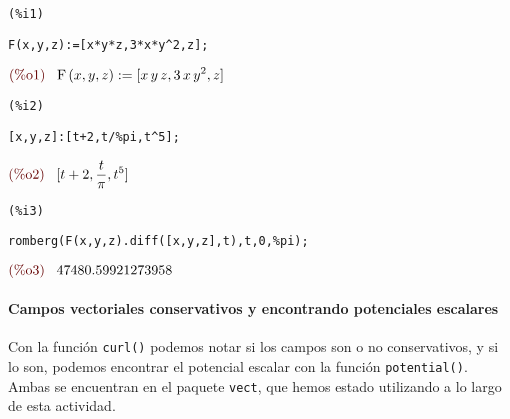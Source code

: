\documentclass[12pt]{article}
\begin{document}
\noindent
\begin{minipage}[t]{8ex}{\color{red}\bf
\begin{verbatim}
(%i1) 
\end{verbatim}}
\end{minipage}
\begin{minipage}[t]{\textwidth}{\color{blue}
\begin{verbatim}
F(x,y,z):=[x*y*z,3*x*y^2,z];
\end{verbatim}}
\end{minipage}
\begin{math}\displaystyle
\parbox{8ex}{\color{labelcolor}(\%o1) }
\mathrm{F}\left( x,y,z\right) :=[x\,y\,z,3\,x\,{y}^{2},z]
\end{math}


\noindent
\begin{minipage}[t]{8ex}{\color{red}\bf
\begin{verbatim}
(%i2) 
\end{verbatim}}
\end{minipage}
\begin{minipage}[t]{\textwidth}{\color{blue}
\begin{verbatim}
[x,y,z]:[t+2,t/%pi,t^5];
\end{verbatim}}
\end{minipage}
\begin{math}\displaystyle
\parbox{8ex}{\color{labelcolor}(\%o2) }
[t+2,\frac{t}{\pi },{t}^{5}]
\end{math}


\noindent
\begin{minipage}[t]{8ex}{\color{red}\bf
\begin{verbatim}
(%i3) 
\end{verbatim}}
\end{minipage}
\begin{minipage}[t]{\textwidth}{\color{blue}
\begin{verbatim}
romberg(F(x,y,z).diff([x,y,z],t),t,0,%pi);
\end{verbatim}}
\end{minipage}
\begin{math}\displaystyle
\parbox{8ex}{\color{labelcolor}(\%o3) }
47480.59921273958
\end{math}

\paragraph{Campos vectoriales conservativos y encontrando potenciales escalares} Con la función \texttt{curl()} podemos notar si los campos son o no conservativos, y si lo son, podemos encontrar el potencial escalar con la función \texttt{potential()}. Ambas se encuentran en el paquete \texttt{vect}, que hemos estado utilizando a lo largo de esta actividad.
\end{document}

